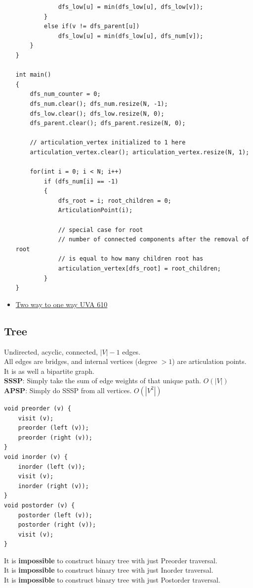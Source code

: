 \documentclass[8pt, a4paper, oneside, twocolumn]{extarticle}
\begin{document}
\begin{itemize}
\begin{verbatim}
            dfs_low[u] = min(dfs_low[u], dfs_low[v]);
        }
        else if(v != dfs_parent[u])
            dfs_low[u] = min(dfs_low[u], dfs_num[v]);
    }
}

int main() 
{
    dfs_num_counter = 0;
    dfs_num.clear(); dfs_num.resize(N, -1);
    dfs_low.clear(); dfs_low.resize(N, 0);
    dfs_parent.clear(); dfs_parent.resize(N, 0);
    
    // articulation_vertex initialized to 1 here
    articulation_vertex.clear(); articulation_vertex.resize(N, 1);

    for(int i = 0; i < N; i++)
        if (dfs_num[i] == -1)
        {
            dfs_root = i; root_children = 0;
            ArticulationPoint(i);
            
            // special case for root
            // number of connected components after the removal of root
            // is equal to how many children root has
            articulation_vertex[dfs_root] = root_children;
        }
}
    \end{verbatim}
    \item \href{https://gist.github.com/sourabh2311/01c2bdf3f7389c2b84d40db5cce506f9}{Two way to one way UVA 610}
\end{itemize}
\subsection{Tree}
Undirected, acyclic, connected, $|V| - 1$ edges.\\
All edges are bridges, and internal vertices (degree $> 1$) are articulation points.\\
It is as well a bipartite graph.\\
\textbf{SSSP}: Simply take the sum of edge weights of that unique path. $O(|V|)$\\
\textbf{APSP}: Simply do SSSP from all vertices. $O(|V^2|)$
\begin{verbatim}
void preorder (v) {
	visit (v);
	preorder (left (v));
	preorder (right (v));
}
void inorder (v) {
	inorder (left (v));
	visit (v);
	inorder (right (v));
}
void postorder (v) {
	postorder (left (v));
	postorder (right (v));
	visit (v);
}
\end{verbatim}
It is \textbf {impossible} to construct binary tree with just Preorder traversal.\\ 
It is \textbf {impossible} to construct binary tree with just Inorder traversal.\\
It is \textbf {impossible} to construct binary tree with just Postorder traversal.
\end{document}

